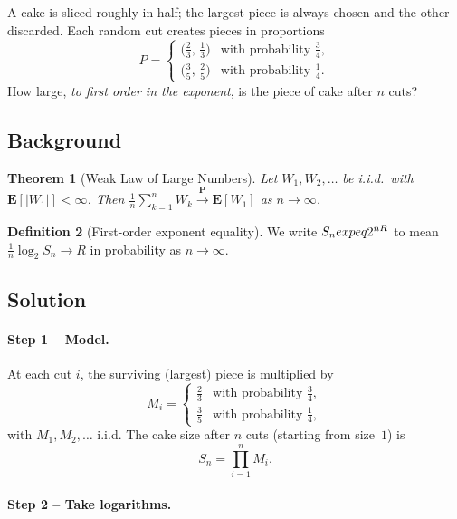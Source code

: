 \documentclass[12pt,a4paper]{article}
\theoremstyle{plain}
\newtheorem{theorem}{Theorem}[section]
\theoremstyle{definition}
\newtheorem{definition}[theorem]{Definition}
\theoremstyle{remark}
\newcommand{\EE}{\mathbf{E}}
\newcommand{\PP}{\mathbf{P}}
\newcommand{\expeq}{\;\dot{=}\;}       %
\begin{document}
A cake is sliced roughly in half; the largest piece is always chosen and the
other discarded.  Each random cut creates pieces in proportions
\[
  P = \begin{cases}
    \bigl(\tfrac{2}{3},\,\tfrac{1}{3}\bigr) & \text{with probability } \tfrac{3}{4},\\[4pt]
    \bigl(\tfrac{3}{5},\,\tfrac{2}{5}\bigr) & \text{with probability } \tfrac{1}{4}.
  \end{cases}
\]
How large, \emph{to first order in the exponent}, is the piece of cake after
$n$ cuts?

\subsection*{Background}

\begin{theorem}[Weak Law of Large Numbers]
  Let $W_1,W_2,\dots$ be i.i.d.\ with $\EE[|W_1|]<\infty$.  Then
  $\frac{1}{n}\sum_{k=1}^n W_k \xrightarrow{\;\PP\;} \EE[W_1]$ as $n\to\infty$.
\end{theorem}

\begin{definition}[First-order exponent equality]
  We write $S_n \\expeq 2^{nR}$ to mean $\frac{1}{n}\log_2 S_n \to R$ in
  probability as $n\to\infty$.
\end{definition}

\subsection*{Solution}

\paragraph{Step 1 – Model.}

At each cut $i$, the surviving (largest) piece is multiplied by
\[
  M_i = \begin{cases}
    \tfrac{2}{3} & \text{with probability } \tfrac{3}{4},\\[2pt]
    \tfrac{3}{5} & \text{with probability } \tfrac{1}{4},
  \end{cases}
\]
with $M_1, M_2, \dots$ i.i.d.  The cake size after $n$ cuts (starting from
size~$1$) is
\[
  S_n = \prod_{i=1}^{n} M_i.
\]

\paragraph{Step 2 – Take logarithms.}
\end{document}
